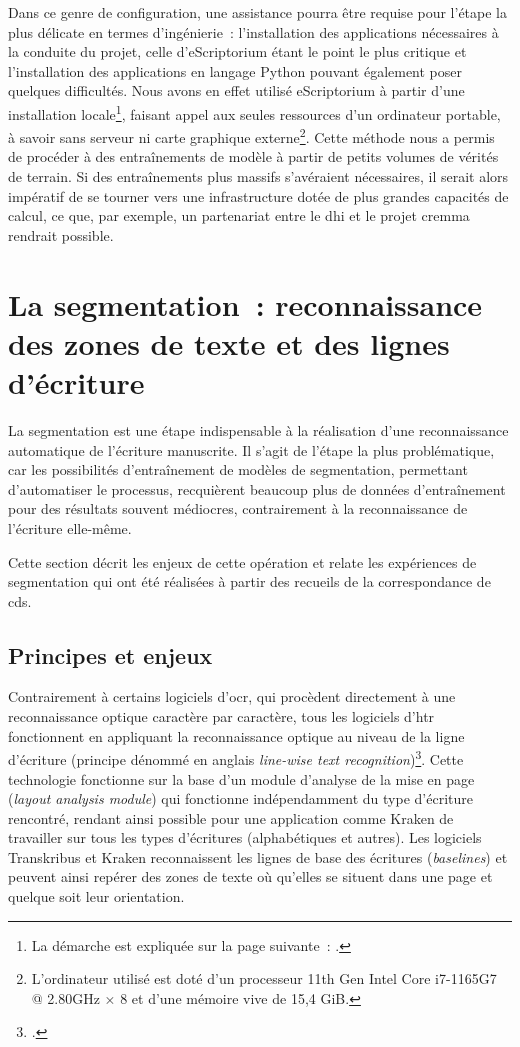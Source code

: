 \documentclass[a4paper,12pt,twoside]{book}
\begin{document}
				Dans ce genre de configuration, une assistance pourra être requise pour l'étape la plus délicate en termes d'ingénierie~: l'installation des applications nécessaires à la conduite du projet, celle d'eScriptorium étant le point le plus critique et l'installation des applications en langage Python pouvant également poser quelques difficultés. Nous avons en effet utilisé eScriptorium à partir d'une installation locale\footnote{La démarche est expliquée sur la page suivante~: \cite{DockerInstallInstallation}.}, faisant appel aux seules ressources d'un ordinateur portable, à savoir sans serveur ni carte graphique externe\footnote{L'ordinateur utilisé est doté d'un processeur 11th Gen Intel Core i7-1165G7 @ 2.80GHz × 8 et d'une mémoire vive de 15,4 GiB.}. Cette méthode nous a permis de procéder à des entraînements de modèle à partir de petits volumes de vérités de terrain. Si des entraînements plus massifs s'avéraient nécessaires, il serait alors impératif de se tourner vers une infrastructure dotée de plus grandes capacités de calcul, ce que, par exemple, un partenariat entre le \gls{dhi} et le projet \gls{cremma} rendrait possible.
						
		\section[La {segmentation}]{La {segmentation}~: reconnaissance des zones de texte et des lignes d'écriture}
			\label{lieu-segmentation}
			
			La {segmentation} est une étape indispensable à la réalisation d'une reconnaissance automatique de l'écriture manuscrite. Il s'agit de l'étape la plus problématique, car les possibilités d'entraînement de modèles de {segmentation}, permettant d'automatiser le processus, recquièrent beaucoup plus de données d'entraînement pour des résultats souvent médiocres, contrairement à la reconnaissance de l'écriture elle-même.
			
			Cette section décrit les enjeux de cette opération et relate les expériences de {segmentation} qui ont été réalisées à partir des recueils de la correspondance de \gls{cds}.
						
			\subsection{Principes et enjeux}
				Contrairement à certains logiciels d'\gls{ocr}, qui procèdent directement à une reconnaissance optique caractère par caractère, tous les logiciels d'\gls{htr} fonctionnent en appliquant la reconnaissance optique au niveau de la ligne d'écriture (principe dénommé en anglais \textit{line-wise text recognition})\footcite{stokesEScriptoriumVREManuscript2021}. Cette technologie fonctionne sur la base d'un module d'analyse de la mise en page (\textit{layout analysis module}) qui fonctionne indépendamment du type d'écriture rencontré, rendant ainsi possible pour une application comme Kraken de travailler sur tous les types d'écritures (alphabétiques et autres). Les logiciels Transkribus et Kraken reconnaissent les lignes de base des écritures (\textit{baselines}) et peuvent ainsi repérer des zones de texte où qu'elles se situent dans une page et quelque soit leur orientation. 
				
\end{document}
